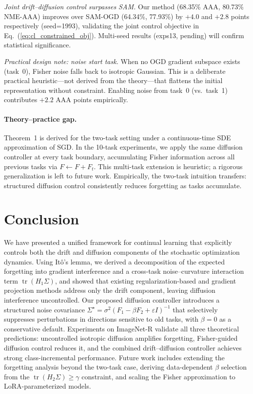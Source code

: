 \documentclass{article}
\begin{document}
\textit{Joint drift--diffusion control surpasses SAM.}
Our method (68.35\% AAA, 80.73\% NME-AAA) improves over SAM-OGD (64.34\%, 77.93\%) by $+4.0$ and $+2.8$ points respectively (seed=1993), validating the joint control objective in Eq.~(\ref{eq:cl_constrained_obj}).
Multi-seed results (exps13, pending) will confirm statistical significance.

\textit{Practical design note: noise start task.}
When no OGD gradient subspace exists (task~0), Fisher noise falls back to isotropic Gaussian.
This is a deliberate practical heuristic---not derived from the theory---that flattens the initial representation without constraint.
Enabling noise from task~0 (vs.\ task~1) contributes $+2.2$ AAA points empirically.

\paragraph{Theory--practice gap.}
Theorem~1 is derived for the two-task setting under a continuous-time SDE approximation of SGD.
In the 10-task experiments, we apply the same diffusion controller at every task boundary, accumulating Fisher information across all previous tasks via $F \leftarrow F + F_t$.
This multi-task extension is heuristic; a rigorous generalization is left to future work.
Empirically, the two-task intuition transfers: structured diffusion control consistently reduces forgetting as tasks accumulate.


\section{Conclusion}
\label{sec:conclusion}

We have presented a unified framework for continual learning that explicitly controls both the drift and diffusion components of the stochastic optimization dynamics.
Using It\^{o}'s lemma, we derived a decomposition of the expected forgetting into gradient interference and a cross-task noise--curvature interaction term $\operatorname{tr}(H_1\Sigma)$, and showed that existing regularization-based and gradient projection methods address only the drift component, leaving diffusion interference uncontrolled.
Our proposed diffusion controller introduces a structured noise covariance $\Sigma^\star = \sigma^2(F_1 - \beta F_2 + \varepsilon I)^{-1}$ that selectively suppresses perturbations in directions sensitive to old tasks, with $\beta=0$ as a conservative default.
Experiments on ImageNet-R validate all three theoretical predictions: uncontrolled isotropic diffusion amplifies forgetting, Fisher-guided diffusion control reduces it, and the combined drift--diffusion controller achieves strong class-incremental performance.
Future work includes extending the forgetting analysis beyond the two-task case, deriving data-dependent $\beta$ selection from the $\operatorname{tr}(H_2\Sigma)\geq\gamma$ constraint, and scaling the Fisher approximation to LoRA-parameterized models.
\end{document}
